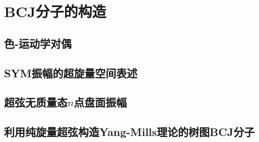 \chapter{BCJ分子的构造}

\section{色-运动学对偶}

\section{SYM振幅的超旋量空间表述}

\section{超弦无质量态$n$点盘面振幅}

\section{利用纯旋量超弦构造Yang-Mills理论的树图BCJ分子}